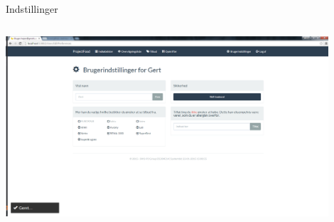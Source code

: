 \begin{frame}{Indstillinger}
\begin{minipage}[0.3\textheight]{\textwidth}
\begin{columns}[T]
\begin{column}{0.5\textwidth}
	  \includegraphics[width=0.9\textwidth,height=0.8\textheight,keepaspectratio]{images/Screenshots/Settings.png}
	\end{column}
	\end{columns}
	

  \end{minipage}
	
\end{frame}

